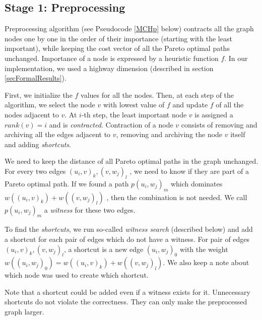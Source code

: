 

\subsection{Stage 1: Preprocessing}
\label{subsecStage1}

Preprocessing algorithm (see Pseudocode \ref{MCHp} below) contracts all the graph nodes one by one in the order of their importance (starting with the least important), while keeping the cost vector of all the Pareto optimal paths unchanged. Importance of a node is expressed by a heuristic function $f$. In our implementation, we used a highway dimension (described in section \ref{secFormalResults}).
 
First, we initialize the $f$ values for all the nodes. Then, at each step of the algorithm, we select the node $v$ with lowest value of $f$ and update $f$ of all the nodes adjacent to $v$. 
At $i$-th step, the least important node $v$ is assigned a $rank(v) = i$ and is \emph{contracted}. 
Contraction of a node $v$ consists of removing and archiving all the edges adjacent to $v$, removing and archiving the node $v$ itself and adding {\em shortcuts}. 

We need to keep the distance of all Pareto optimal paths in the graph unchanged. For every two edges $(u_i,v)_k,(v,w_j)_l$ , we need to know if they are part of a Pareto optimal path. If we found a path $p(u_i,w_j)_m$ which dominates $w((u_i,v)_k)+w((v,w_j)_l)$ , then the combination is not needed. We call $p(u_i,w_j)_m$ a \emph{witness} for these two edges. 

To find the {\em shortcuts}, we run so-called {\em witness search} (described
below) and add a shortcut for each pair of edges which do not have a witness.
For pair of edges $(u_i,v)_k,(v,w_j)_l$, a  shortcut is a new edge $(u_i,w_j)_0$ 
with the weight $w((u_i,w_j)_0) = w((u_i,v)_k)+w((v,w_j)_l)$. 
We also keep a note about which node was used to create which
shortcut.

Note that a shortcut could be added even if a witness exists for it. Unnecessary shortcuts do not violate the correctness. They can only make the preprocessed graph larger.

